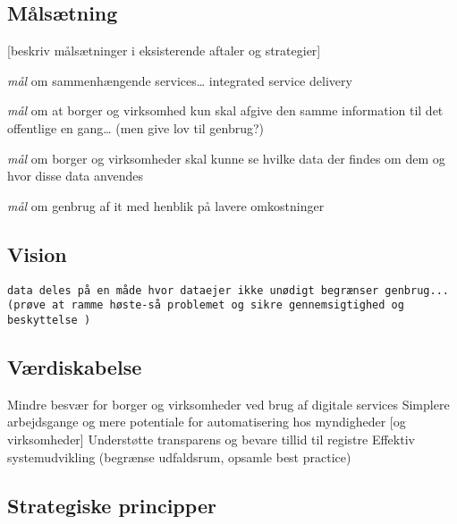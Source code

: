 \subsection{Målsætning}\label{muxe5lsuxe6tning}

{[}beskriv målsætninger i eksisterende aftaler og strategier{]}

\begin{description}
\tightlist
\item[Interoperability]
\emph{mål} om sammenhængende services\ldots{} integrated service
delivery
\item[Once-only]
\emph{mål} om at borger og virksomhed kun skal afgive den samme
information til det offentlige en gang\ldots{} (men give lov til
genbrug?)
\item[Transperancy]
\emph{mål} om borger og virksomheder skal kunne se hvilke data der
findes om dem og hvor disse data anvendes
\item[Re-use]
\emph{mål} om genbrug af it med henblik på lavere omkostninger
\end{description}

\subsection{Vision}\label{vision}

\begin{verbatim}
data deles på en måde hvor dataejer ikke unødigt begrænser genbrug...
(prøve at ramme høste-så problemet og sikre gennemsigtighed og beskyttelse )
\end{verbatim}

\subsection{Værdiskabelse}\label{vuxe6rdiskabelse}

Mindre besvær for borger og virksomheder ved brug af digitale services
Simplere arbejdsgange og mere potentiale for automatisering hos
myndigheder {[}og virksomheder{]} Understøtte transparens og bevare
tillid til registre Effektiv systemudvikling (begrænse udfaldsrum,
opsamle best practice)

\subsection{Strategiske principper}\label{strategiske-principper}


